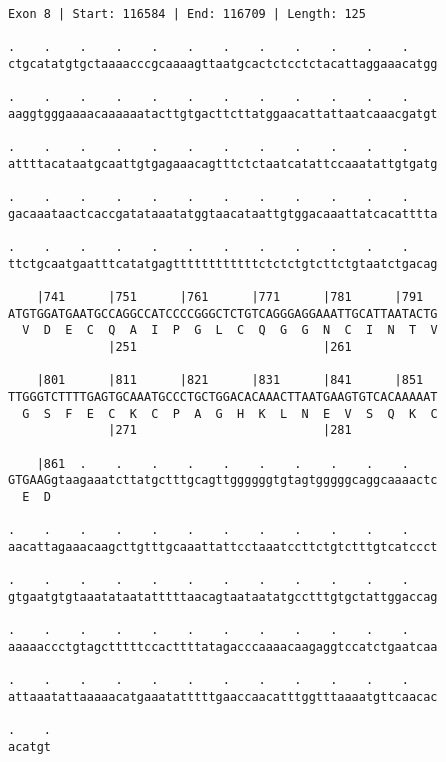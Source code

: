 \documentclass{article}
\begin{document}
\newpage
\begin{Verbatim}[fontfamily=courier]
Exon 8 | Start: 116584 | End: 116709 | Length: 125

.    .    .    .    .    .    .    .    .    .    .    .    
ctgcatatgtgctaaaacccgcaaaagttaatgcactctcctctacattaggaaacatgg

.    .    .    .    .    .    .    .    .    .    .    .    
aaggtgggaaaacaaaaaatacttgtgacttcttatggaacattattaatcaaacgatgt

.    .    .    .    .    .    .    .    .    .    .    .    
attttacataatgcaattgtgagaaacagtttctctaatcatattccaaatattgtgatg

.    .    .    .    .    .    .    .    .    .    .    .    
gacaaataactcaccgatataaatatggtaacataattgtggacaaattatcacatttta

.    .    .    .    .    .    .    .    .    .    .    .    
ttctgcaatgaatttcatatgagttttttttttttctctctgtcttctgtaatctgacag

    |741      |751      |761      |771      |781      |791  
ATGTGGATGAATGCCAGGCCATCCCCGGGCTCTGTCAGGGAGGAAATTGCATTAATACTG
  V  D  E  C  Q  A  I  P  G  L  C  Q  G  G  N  C  I  N  T  V
              |251                          |261            

    |801      |811      |821      |831      |841      |851  
TTGGGTCTTTTGAGTGCAAATGCCCTGCTGGACACAAACTTAATGAAGTGTCACAAAAAT
  G  S  F  E  C  K  C  P  A  G  H  K  L  N  E  V  S  Q  K  C
              |271                          |281            

    |861  .    .    .    .    .    .    .    .    .    .    
GTGAAGgtaagaaatcttatgctttgcagttggggggtgtagtgggggcaggcaaaactc
  E  D                                                      

.    .    .    .    .    .    .    .    .    .    .    .    
aacattagaaacaagcttgtttgcaaattattcctaaatccttctgtctttgtcatccct

.    .    .    .    .    .    .    .    .    .    .    .    
gtgaatgtgtaaatataatatttttaacagtaataatatgcctttgtgctattggaccag

.    .    .    .    .    .    .    .    .    .    .    .    
aaaaaccctgtagctttttccacttttatagacccaaaacaagaggtccatctgaatcaa

.    .    .    .    .    .    .    .    .    .    .    .    
attaaatattaaaaacatgaaatatttttgaaccaacatttggtttaaaatgttcaacac

.    .
acatgt
\end{Verbatim}
\newpage
\end{document}
